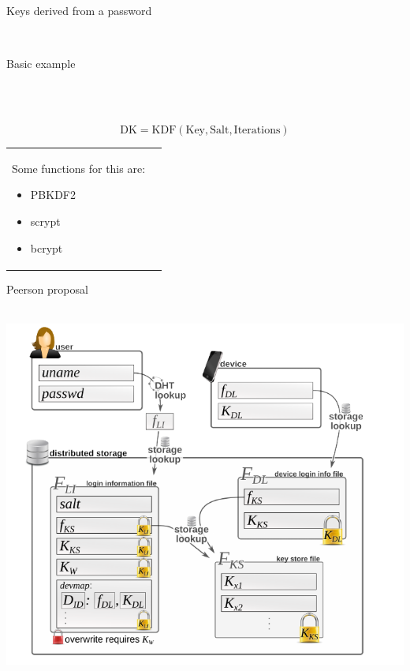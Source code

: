 \documentclass[12pt]{beamer}
\renewcommand{\frametitle}[1]{\vspace{0.2cm}\begin{huge}#1\end{huge}\\}
\renewcommand{\framesubtitle}[1]{\vspace{0.4cm} \hspace{0.4cm}\begin{large}#1\end{large}\\}
\begin{document}
  \begin{frame}
  \frametitle{Keys derived from a password}
  \framesubtitle{Basic example}
  \framesubtitle{}
  $$ \text{DK}=\text{KDF}(\text{Key}, \text{Salt}, \text{Iterations}) $$
  \begin{table}
  \begin{tabular}{p{7cm}p{3cm}}
  Some functions for this are:
  \begin{itemize}
    \item PBKDF2
    \item scrypt
    \item bcrypt
  \end{itemize}
  &
  \vspace{1.5cm}
  \end{tabular}
  \end{table}
  \end{frame}


  \begin{frame}
  \frametitle{Peerson proposal}
  \center
  \includegraphics[height=0.9\textheight]{../../../img/password_peerson}\\
  
  \end{frame}
\end{document}
